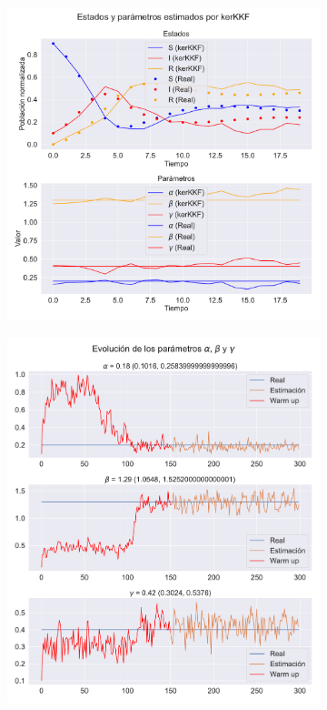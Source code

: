 \begin{figure}[h]
    \centering
    \begin{subfigure}[b]{0.49\textwidth}
         \includegraphics[height=\linewidth]{img/content/chapter4/nonlinear_filters_sir_rec_params.pdf}
         \caption{}
         \label{fig:nonlinear_filters_sir_rec_params}
    \end{subfigure}
    \begin{subfigure}[b]{0.49\textwidth}
         \includegraphics[height=\linewidth]{img/content/chapter4/nonlinear_filters_sir_rec_params_evolution.pdf}

\end{subfigure}
\end{figure}
